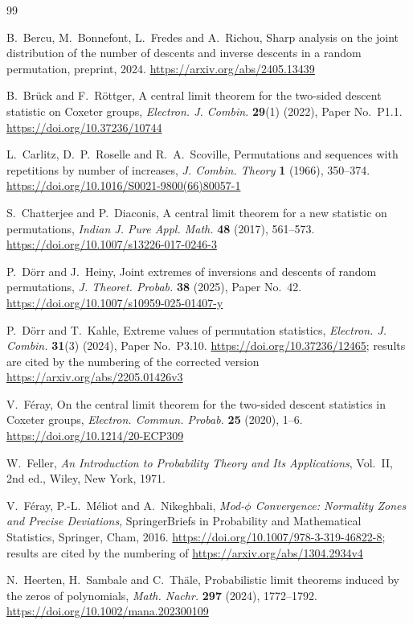 \documentclass[11pt]{amsart}
\theoremstyle{remark}
\begin{document}
\begin{thebibliography}{99}

B.~Bercu, M.~Bonnefont, L.~Fredes and A.~Richou, Sharp analysis on the joint distribution of the number of descents and inverse descents in a random permutation, preprint, 2024. \url{https://arxiv.org/abs/2405.13439}

B.~Br\"uck and F.~R\"ottger, A central limit theorem for the two-sided descent statistic on Coxeter groups, \emph{Electron. J. Combin.} \textbf{29}(1) (2022), Paper No.~P1.1. \url{https://doi.org/10.37236/10744}

L.~Carlitz, D.~P.~Roselle and R.~A.~Scoville, Permutations and sequences with repetitions by number of increases, \emph{J. Combin. Theory} \textbf{1} (1966), 350--374. \url{https://doi.org/10.1016/S0021-9800(66)80057-1}

S.~Chatterjee and P.~Diaconis, A central limit theorem for a new statistic on permutations, \emph{Indian J. Pure Appl. Math.} \textbf{48} (2017), 561--573. \url{https://doi.org/10.1007/s13226-017-0246-3}

P.~D\"orr and J.~Heiny, Joint extremes of inversions and descents of random permutations, \emph{J. Theoret. Probab.} \textbf{38} (2025), Paper No.~42. \url{https://doi.org/10.1007/s10959-025-01407-y}

P.~D\"orr and T.~Kahle, Extreme values of permutation statistics, \emph{Electron. J. Combin.} \textbf{31}(3) (2024), Paper No.~P3.10. \url{https://doi.org/10.37236/12465}; results are cited by the numbering of the corrected version \url{https://arxiv.org/abs/2205.01426v3}

V.~F\'eray, On the central limit theorem for the two-sided descent statistics in Coxeter groups, \emph{Electron. Commun. Probab.} \textbf{25} (2020), 1--6. \url{https://doi.org/10.1214/20-ECP309}

W.~Feller, \emph{An Introduction to Probability Theory and Its Applications}, Vol.~II, 2nd ed., Wiley, New York, 1971.

V.~F\'eray, P.-L.~M\'eliot and A.~Nikeghbali, \emph{Mod-$\phi$ Convergence: Normality Zones and Precise Deviations}, SpringerBriefs in Probability and Mathematical Statistics, Springer, Cham, 2016. \url{https://doi.org/10.1007/978-3-319-46822-8}; results are cited by the numbering of \url{https://arxiv.org/abs/1304.2934v4}

N.~Heerten, H.~Sambale and C.~Th\"ale, Probabilistic limit theorems induced by the zeros of polynomials, \emph{Math. Nachr.} \textbf{297} (2024), 1772--1792. \url{https://doi.org/10.1002/mana.202300109}


\end{thebibliography}
\end{document}
